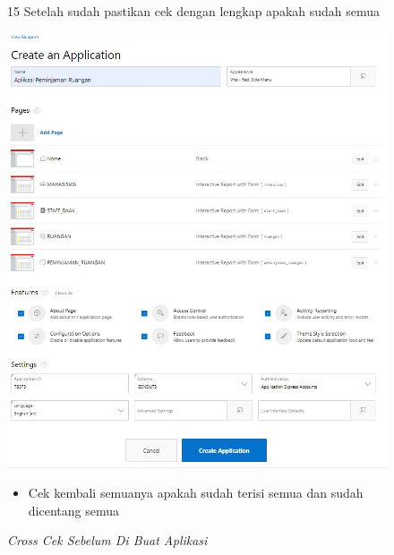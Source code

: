 \begin{itemize}
        \begin{figure}[!htbp]
        \item[15]Setelah sudah pastikan cek dengan lengkap apakah sudah semua
        \begin{center}
        \includegraphics[scale=0.4]{figures/pastikan_sudah_dicek_dan_lengkap.jpg}
        \caption{\textit{Cross Cek Sebelum Di Buat Aplikasi}}
        \end{center}
        \begin{itemize}
            \item Cek kembali semuanya apakah sudah terisi semua dan sudah dicentang semua
        \end{itemize}
        \end{figure}
        

\end{itemize}
